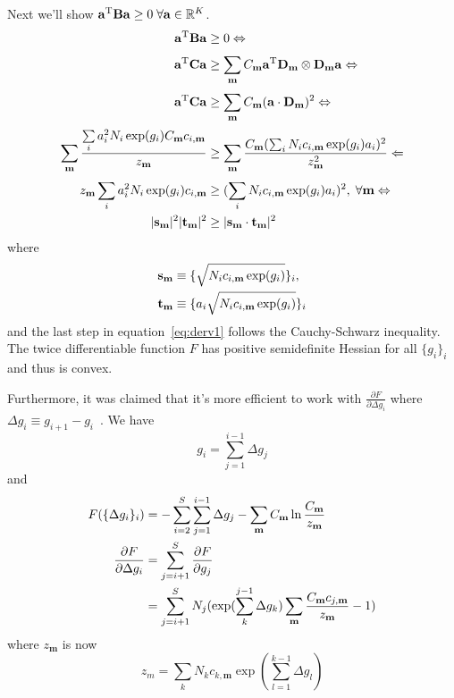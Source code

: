 Next we'll show $\mathbf{a}^{\mathrm{T}} \mathbf{B} \mathbf{a} \ge 0\;\forall \mathbf{a} \in \mathbb{R}^{K}$.
\begin{align}
\mathbf{a}^{\mathrm{T}} \mathbf{B} \mathbf{a} &\ge 0 \Leftrightarrow \notag \\
\mathbf{a}^{\mathrm{T}} \mathbf{C} \mathbf{a} &\ge \sum_{\mathbf{m}}^{} C_{\mathbf{m}}  \mathbf{a}^{\mathrm{T}} \mathbf{D}_{\mathbf{m}} \otimes \mathbf{D}_{\mathbf{m}} \mathbf{a}  \Leftrightarrow \notag \\
\mathbf{a}^{\mathrm{T}} \mathbf{C} \mathbf{a} &\ge \sum_{\mathbf{m}}^{} C_{\mathbf{m}} (\mathbf{a} \cdot \mathbf{D}_{\mathbf{m}})^2 \Leftrightarrow \notag \\
\sum_{\mathbf{m}}^{} \frac{\sum\limits_{i}^{} a_{i}^{2} N_{i} \exp(g_{i}) C_{\mathbf{m}} c_{i,\mathbf{m}}}{z_{\mathbf{m}}} &\ge  
\sum_{\mathbf{m}}^{} \frac{C_{\mathbf{m}}(\sum_{i}^{} N_{i} c_{i,\mathbf{m}} \exp(g_{i}) a_{i})^{2}}{z_{\mathbf{m}}^{2}} \Leftarrow \notag \\
z_{\mathbf{m}} \sum\limits_{i}^{} a_{i}^{2} N_{i} \exp(g_{i}) c_{i,\mathbf{m}} &\ge  
(\sum_{i}^{} N_{i} c_{i,\mathbf{m}} \exp(g_{i}) a_{i})^{2}, \;\forall \mathbf{m} \Leftrightarrow \notag \\
\lvert\mathbf{\mathbf{s}_{\mathbf{m}}}\rvert^{2} \lvert\mathbf{\mathbf{t}_{\mathbf{m}}}\rvert^{2} &\ge \lvert\mathbf{\mathbf{s}_{\mathbf{m}} \cdot \mathbf{t}_{\mathbf{m}}}\rvert^{2}  
\label{eq:derv1}
\end{align}
where
\begin{align}
\mathbf{s}_{\mathbf{m}} &\equiv \{\sqrt{N_{i} c_{i,\mathbf{m}} \exp(g_{i})}\}_{i}, \notag \\
\mathbf{t}_{\mathbf{m}} &\equiv \{a_{i} \sqrt{N_{i} c_{i,\mathbf{m}} \exp(g_{i})}\}_{i}
\label{eq:derv2}
\end{align}
and the last step in equation~\ref{eq:derv1} follows the Cauchy-Schwarz inequality.  
The twice differentiable function $F$ has positive semidefinite Hessian for all $\{g_{i}\}_{i}$ 
and thus is convex.

Furthermore, it was claimed that it's more efficient to work with $\frac{\partial F}{\partial \Delta g_{i}}$ 
where $\Delta g_{i} \equiv g_{i+1}-g_{i}$~\cite{Zhu2012}. We have 
\begin{equation}
g_{i} = \sum_{j=1}^{i-1} \Delta g_{j} 
\label{eq:gidgj}
\end{equation}
and 
\begin{align}
F(\{\Delta g_{i}\}_{i}) &= - \sum_{i=2}^{S} \sum_{j=1}^{i-1} \Delta g_{j} - \sum_{\mathbf{m}}^{} C_{\mathbf{m}} \ln \frac{C_{\mathbf{m}}}{z_{\mathbf{m}}} \\
\frac{\partial F}{\partial \Delta g_{i}} &= \sum_{j=i+1}^{S} \frac{\partial F}{\partial g_{j}} \notag \\
&= \sum_{j=i+1}^{S} N_{j} (\exp(\sum_{k}^{j-1} \Delta g_{k}) \sum_{\mathbf{m}}^{} \frac{C_{\mathbf{m}} c_{j,\mathbf{m}}}{z_{\mathbf{m}}} - 1) 
\label{eq:dfddgj}
\end{align}
where $z_{\mathbf{m}}$ is now
\begin{equation}
z_{m} = \sum_{k}^{} N_{k} c_{k,\mathbf{m}} \exp(\sum_{l=1}^{k-1} \Delta g_{l})
\label{eq:zdgj}
\end{equation}
